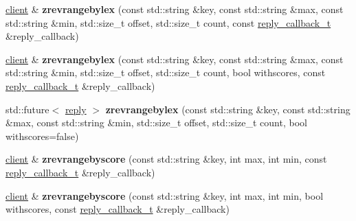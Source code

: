 \begin{DoxyCompactItemize}
\item 
\mbox{\label{classcpp__redis_1_1client_a51711a1cb71e28ddcf0f91020f8a47fa}} 
\mbox{\hyperlink{classcpp__redis_1_1client}{client}} \& {\bfseries zrevrangebylex} (const std\+::string \&key, const std\+::string \&max, const std\+::string \&min, std\+::size\+\_\+t offset, std\+::size\+\_\+t count, const \mbox{\hyperlink{classcpp__redis_1_1client_af7a65eb21aa25230bfbb0b0203c4fc04}{reply\+\_\+callback\+\_\+t}} \&reply\+\_\+callback)
\item 
\mbox{\label{classcpp__redis_1_1client_a890895091a341a9d7cd7f029444a5745}} 
\mbox{\hyperlink{classcpp__redis_1_1client}{client}} \& {\bfseries zrevrangebylex} (const std\+::string \&key, const std\+::string \&max, const std\+::string \&min, std\+::size\+\_\+t offset, std\+::size\+\_\+t count, bool withscores, const \mbox{\hyperlink{classcpp__redis_1_1client_af7a65eb21aa25230bfbb0b0203c4fc04}{reply\+\_\+callback\+\_\+t}} \&reply\+\_\+callback)
\item 
\mbox{\label{classcpp__redis_1_1client_a281b9f496d324f25b90bb97e15a4b7aa}} 
std\+::future$<$ \mbox{\hyperlink{classcpp__redis_1_1reply}{reply}} $>$ {\bfseries zrevrangebylex} (const std\+::string \&key, const std\+::string \&max, const std\+::string \&min, std\+::size\+\_\+t offset, std\+::size\+\_\+t count, bool withscores=false)
\item 
\mbox{\label{classcpp__redis_1_1client_a6b5bd2e7e646e785116726f3413afeb3}} 
\mbox{\hyperlink{classcpp__redis_1_1client}{client}} \& {\bfseries zrevrangebyscore} (const std\+::string \&key, int max, int min, const \mbox{\hyperlink{classcpp__redis_1_1client_af7a65eb21aa25230bfbb0b0203c4fc04}{reply\+\_\+callback\+\_\+t}} \&reply\+\_\+callback)
\item 
\mbox{\label{classcpp__redis_1_1client_a8ac323056b0b2948949844eccd6c8215}} 
\mbox{\hyperlink{classcpp__redis_1_1client}{client}} \& {\bfseries zrevrangebyscore} (const std\+::string \&key, int max, int min, bool withscores, const \mbox{\hyperlink{classcpp__redis_1_1client_af7a65eb21aa25230bfbb0b0203c4fc04}{reply\+\_\+callback\+\_\+t}} \&reply\+\_\+callback)
\item 
\mbox{\label{classcpp__redis_1_1client_a9f627d5567f55d5b9db5b46412890e54}} 

\end{DoxyCompactItemize}
